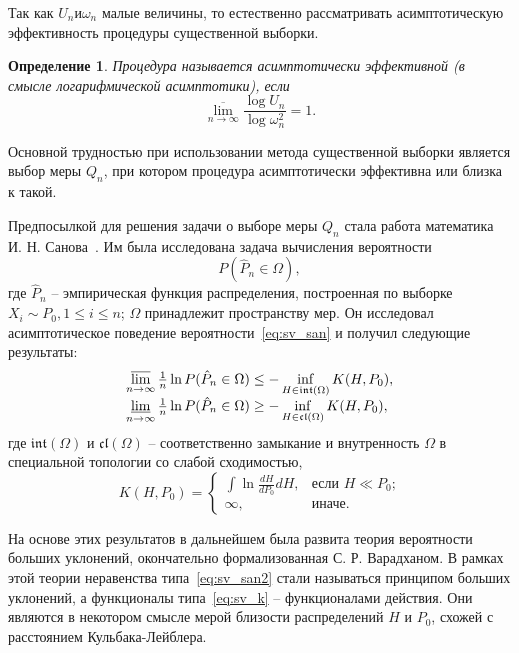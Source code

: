 \documentclass[12pt, specialist, subf, substylefile = spbu.rtx]{disser}
\newtheorem{definition}{Определение}
\DeclareMathOperator*{\toplim}{\overline\lim}
\DeclareMathOperator*{\botlim}{\underline\lim}
\begin{document}
Так как $U_n и \omega_n$ малые величины, то естественно рассматривать асимптотическую эффективность процедуры существенной выборки. 

\begin{definition}
Процедура называется асимптотически эффективной (в смысле логарифмической асимптотики), если 
$$
\overline{\lim\limits_{n \to \infty}} \frac{\log U_n}{\log \omega_n^2} = 1.
$$
\end{definition}

Основной трудностью при использовании метода существенной выборки является выбор меры $Q_n$, при котором процедура асимптотически эффективна или близка к такой.

Предпосылкой для решения задачи о выборе меры $Q_n$ стала работа математика И. Н. Санова~\cite{Sanov1957}. Им была исследована задача вычисления вероятности 
\begin{equation}\label{eq:sv_san}
P(\hat{P}_n \in \Omega),
\end{equation}
где $\hat{P}_n$ -- эмпирическая функция распределения, построенная по выборке $X_i \sim P_0, 1 \le i \le n$; $\Omega$ принадлежит пространству мер. Он исследовал асимптотическое поведение вероятности~\eqref{eq:sv_san} и получил следующие результаты:
\begin{equation}\label{eq:sv_san2}
\begin{tabular}{l}
$\toplim\limits_{n \to \infty} \frac{1}{n} \ln P(\hat{P}_n \in \Omega) \le -\inf\limits_{H\in \mathfrak{int}(\Omega)} K(H, P_0),$
\\
$\botlim\limits_{n \to \infty} \frac{1}{n} \ln P(\hat{P}_n \in \Omega) \ge -\inf\limits_{H\in \mathfrak{cl}(\Omega)} K(H, P_0),$
\end{tabular}
\end{equation}
где $\mathfrak{int}(\Omega)$ и $\mathfrak{cl}(\Omega)$ -- соответственно замыкание и внутренность $\Omega$ в специальной топологии со слабой сходимостью, 
\begin{equation}\label{eq:sv_k}
K(H, P_0)=
\begin{cases}
\int \ln \frac{dH}{dP_0}dH, 
	&\text{если $H \ll P_0$;}\\
\infty,	
	&\text{иначе.}
\end{cases}
\end{equation}

На основе этих результатов в дальнейшем была развита теория вероятности больших уклонений, окончательно формализованная С. Р. Варадханом. В рамках этой теории неравенства типа~\eqref{eq:sv_san2} стали называться принципом больших уклонений, а функционалы типа~\eqref{eq:sv_k}
-- функционалами действия. Они являются в некотором смысле мерой близости распределений $H$ и $P_0$, схожей с расстоянием Кульбака-Лейблера.
\end{document}
